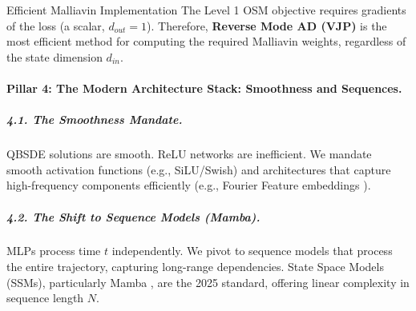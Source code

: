 \documentclass[11pt,letterpaper,oneside]{article}
\theoremstyle{plain}
\theoremstyle{definition}
\theoremstyle{remark}
\begin{document}
\begin{figure}[ht]
\captionsetup{hypcap=false}
\label{fig:AD_Geometry_R3}
\end{figure}

\begin{distillresult}{Efficient Malliavin Implementation}
The Level 1 OSM objective requires gradients of the loss (a scalar, $d_{out}=1$). Therefore, \textbf{Reverse Mode AD (VJP)} is the most efficient method for computing the required Malliavin weights, regardless of the state dimension $d_{in}$.
\end{distillresult}

\paragraph{Pillar 4: The Modern Architecture Stack: Smoothness and Sequences.}

\subparagraph{4.1. The Smoothness Mandate.}
QBSDE solutions are smooth. ReLU networks are inefficient. We mandate smooth activation functions (e.g., SiLU/Swish) and architectures that capture high-frequency components efficiently (e.g., Fourier Feature embeddings \cite{Tancik2020}).

\subparagraph{4.2. The Shift to Sequence Models (Mamba).}
MLPs process time $t$ independently. We pivot to sequence models that process the entire trajectory, capturing long-range dependencies. State Space Models (SSMs), particularly Mamba \cite{GuDao2024_Mamba}, are the 2025 standard, offering linear complexity in sequence length $N$.
\end{document}
